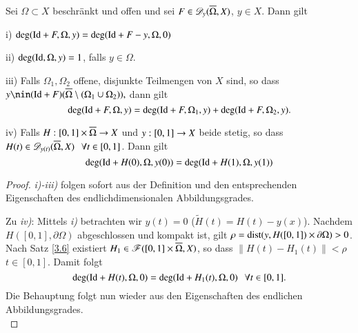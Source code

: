 \begin{theorem}\label{3.10}
    Sei $\Omega\subset X$ beschränkt und offen und sei $F\in \mathscr D_y(\overline\Omega,X)$, $y\in X$. Dann gilt
    \begin{description}
        \item{i)}
        $\deg(\mathrm{Id}+F,\Omega,y)=\deg(\mathrm{Id}+F-y,\Omega,0)$
        \item{ii)}
        $\deg(\mathrm{Id}, \Omega,y)=1$, falls $y\in \Omega.$
        \item{iii)}
        Falls $\Omega_1,\Omega_2$ offene, disjunkte Teilmengen von $X$ sind, so dass
        $y\nin (\Id+F)(\ol\Omega\setminus (\Omega_1\cup\Omega_2)),$ dann gilt
        \[
            \deg(\mathrm{Id}+F,\Omega,y)=\deg(\mathrm{Id}+F,\Omega_1,y)+\deg(\mathrm{Id}+F,\Omega_2,y).
        \]
        \item{iv)}
        Falls $H:[0,1]\times\overline\Omega\rightarrow X$ und $y:[0,1]\rightarrow X$ beide stetig, so dass $H(t)\in 
        \mathscr D_{y(t)}(\overline\Omega,X) \hspace{.25cm} \forall t\in [0,1]$. Dann gilt
        \[
            \deg(\mathrm{Id}+H(0),\Omega,y(0))=\deg(\mathrm{Id}+H(1), \Omega,y(1))
        \]
    \end{description}
\end{theorem}

\begin{proof}
    \textit{i)-iii)} folgen sofort aus der Definition und den entsprechenden Eigenschaften des
    endlichdimensionalen Abbildungsgrades.

    \noindent Zu \textit{iv)}: Mittels \textit{i)} betrachten wir $y(t)=0$ ($\tilde H(t)=H(t)-y(x)$).
    Nachdem $H([0,1],\partial \Omega)$ abgeschlossen und kompakt ist, gilt
    $\rho=\mathrm{dist}(y,H([0,1])\times\partial\Omega)>0$. Nach Satz \ref{3.6} existiert $H_1\in \mathscr F([0,1]
    \times\overline\Omega, X)$, so dass $\|H(t)-H_1(t)\|<\rho$ $t\in [0,1]$. Damit folgt
    \[
        \deg(\mathrm{Id}+H(t),\Omega,0)=\deg(\mathrm{Id}+H_1(t),\Omega,0) \hspace{.25cm} \forall t\in [0,1].
    \]
    Die Behauptung folgt nun wieder aus den Eigenschaften des endlichen Abbildungsgrades.
    \[ \]
\end{proof}
